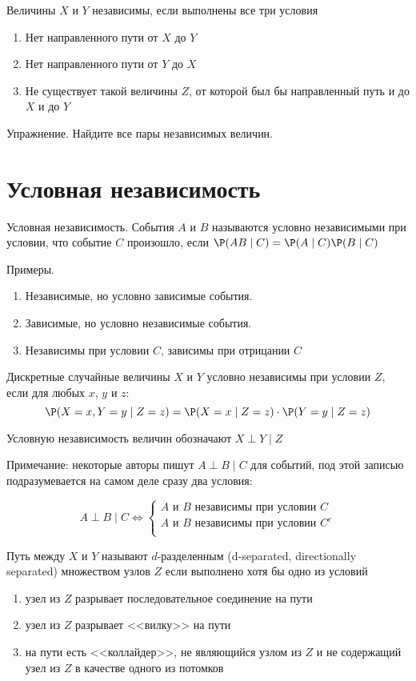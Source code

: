 \documentclass[pdftex,12pt,a4paper]{article}
\begin{document}
Величины $X$ и $Y$ независимы, если выполнены все три условия 
\begin{enumerate}
\item Нет направленного пути от $X$ до $Y$
\item Нет направленного пути от $Y$ до $X$
\item Не существует такой величины $Z$, от которой был бы направленный путь и до $X$ и до $Y$
\end{enumerate}


Упражнение. Найдите все пары независимых величин.

\section{Условная независимость}

Условная независимость. События $A$ и $B$ называются условно независимыми при условии, что событие $C$ произошло, если $\P(AB \mid C)=\P(A \mid C)\P(B \mid C)$

Примеры.
\begin{enumerate}
\item Независимые, но условно зависимые события.
\item Зависимые, но условно независимые события.
\item Независимы при условии $C$, зависимы при отрицании $C$
\end{enumerate}

Дискретные случайные величины $X$ и $Y$ условно независимы при условии $Z$, если для любых $x$, $y$ и $z$:
\begin{equation}
\P(X=x,Y=y \mid Z=z) = \P(X=x \mid Z=z)\cdot \P(Y=y \mid Z=z)
\end{equation}

Условную независимость величин обозначают $X \perp Y \mid Z$


Примечание: некоторые авторы пишут $A \perp B \mid C$ для событий, под этой записью подразумевается на самом деле сразу два условия:

\begin{equation}
A \perp B \mid C \Leftrightarrow 
\begin{cases}
A \mbox{ и } B \mbox{ независимы при условии } C \\
A \mbox{ и } B \mbox{ независимы при условии } C^c \\
\end{cases}
\end{equation}


Путь между $X$ и $Y$ называют $d$-разделенным (d-separated, directionally separated) множеством узлов $Z$ если выполнено хотя бы одно из условий
\begin{enumerate}
\item узел из $Z$ разрывает последовательное соединение на пути
\item узел из $Z$ разрывает <<вилку>> на пути
\item на пути есть <<коллайдер>>, не являющийся узлом из $Z$ и не содержащий узел из $Z$ в качестве одного из потомков
\end{enumerate}
\end{document}

